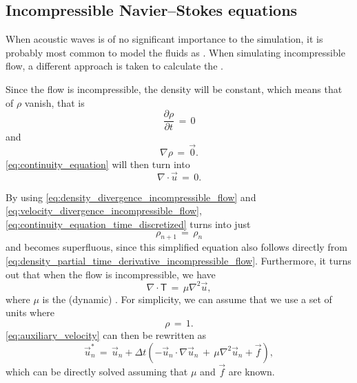 \subsection{Incompressible Navier--Stokes equations}

When acoustic waves is of no significant importance to the simulation, it is probably most common to model the fluids as \incompressible. When simulating incompressible flow, a different approach is taken to calculate the .

Since the flow is incompressible, the density will be constant, which means that \derivatives of $\rho$ vanish, that is
%
\begin{equation} \label{eq:density_partial_time_derivative_incompressible_flow}
\frac{\partial \rho}{\partial t} \,=\, 0
\end{equation}
%
and
%
\begin{equation} \label{eq:density_divergence_incompressible_flow}
\nabla\rho \,=\, \vec{0}.
\end{equation}
%
\eqref{eq:continuity_equation} will then turn into
%
\begin{equation} \label{eq:velocity_divergence_incompressible_flow}
\nabla\cdot\vec{u} \,=\, 0.
\end{equation}

By using \eqref{eq:density_divergence_incompressible_flow} and \eqref{eq:velocity_divergence_incompressible_flow}, \eqref{eq:continuity_equation_time_discretized} turns into just
%
\begin{equation} \label{eq:continuity_equation_superfluous}
{\rho_{n+1} \,=\, \rho_n}
\end{equation}
%
and becomes superfluous, since this simplified equation also follows directly from \eqref{eq:density_partial_time_derivative_incompressible_flow}. Furthermore, it turns out that when the flow is incompressible, we have
%
\begin{equation} \label{eq:deviatoric_stress_tensor_incompressible_flow}
\nabla\cdot\boldsymbol{\mathsf{T}} \,=\, \mu\nabla^2\vec{u},
\end{equation}
%
where $\mu$ is the (dynamic) \viscosity \citep{Batchelor1967}. For simplicity, we can assume that we use a set of units where
%
\begin{equation} \label{eq:rho_is_one}
\rho \,=\, 1.
\end{equation}
%
\eqref{eq:auxiliary_velocity} can then be rewritten as
%
\begin{equation} \label{eq:auxiliary_velocity_reduced}
\vec{u}^*_n \,= \, \vec{u}_{n} + \Delta t(- \vec{u}_{n}\cdot\nabla\vec{u}_{n} \,+\, \mu\nabla^2\vec{u}_{n} + \vec{f}),
\end{equation}
%
which can be directly solved assuming that $\mu$ and $\vec{f}$ are known.

